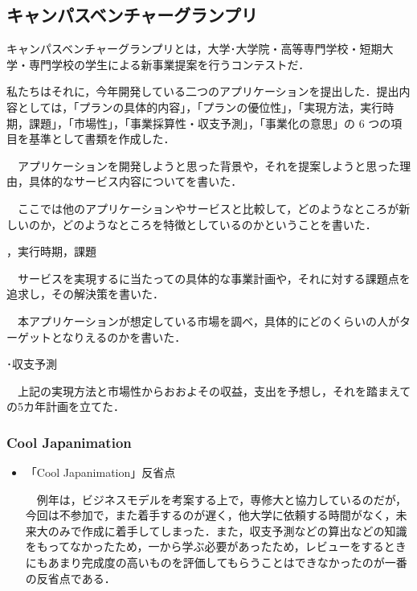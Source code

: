 \subsection{キャンパスベンチャーグランプリ}
\par
キャンパスベンチャーグランプリとは，大学･大学院・高等専門学校・短期大学・専門学校の学生による新事業提案を行うコンテストだ．
\par
私たちはそれに，今年開発している二つのアプリケーションを提出した．提出内容としては，「プランの具体的内容」，「プランの優位性」，「実現方法，実行時期，課題」，「市場性」，「事業採算性・収支予測」，「事業化の意思」の 6 つの項目を基準として書類を作成した．
\par
\begin{enumerate}
\par
　アプリケーションを開発しようと思った背景や，それを提案しようと思った理由，具体的なサービス内容についてを書いた．
\par
{}
\par
　ここでは他のアプリケーションやサービスと比較して，どのようなところが新しいのか，どのようなところを特徴としているのかということを書いた．
\par
{}，実行時期，課題
\par
　サービスを実現するに当たっての具体的な事業計画や，それに対する課題点を追求し，その解決策を書いた．
\par
{}
\par
　本アプリケーションが想定している市場を調べ，具体的にどのくらいの人がターゲットとなりえるのかを書いた．
\par
{}･収支予測
\par
　上記の実現方法と市場性からおおよその収益，支出を予想し，それを踏まえての5カ年計画を立てた．
\end{enumerate}
\par
\subsubsection{Cool Japanimation}
\par
\begin{itemize}
\par
　9月26日から10月31日の期間で提出するための書類作成を行った．今回は未来大のみで書類作成を行った．アプリケーションでどのような利益を得るか，またそのモデルからどれくらいの規模の利益を得られるか，アプリケーションを企業として運営した場合の人件費などについて考えた．収支予測を考えるに至って，未来大では知識不足だったので，作成に大いに手間取ってしまった．また，一次審査を通過することはなかった．
\par
\item「Cool Japanimation」反省点
\par
　例年は，ビジネスモデルを考案する上で，専修大と協力しているのだが，今回は不参加で，また着手するのが遅く，他大学に依頼する時間がなく，未来大のみで作成に着手してしまった．また，収支予測などの算出などの知識をもってなかったため，一から学ぶ必要があったため，レビューをするときにもあまり完成度の高いものを評価してもらうことはできなかったのが一番の反省点である．
\end{itemize}
